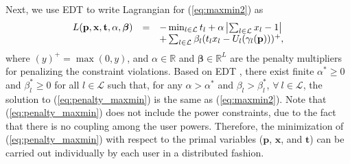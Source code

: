 \documentclass[10pt,journal,letterpaper,compsoc]{IEEEtran}
\begin{document}
{{Next, we use EDT to write Lagrangian for (\ref{eq:maxmin2}) as
\begin{equation}\begin{array}
[c]{lll}L(\mathbf{p},\mathbf{x},\mathbf{t},\alpha,\boldsymbol{\beta})&=&-\min_{l\in\mathcal{L}}t_l+\alpha\left|\sum_{l\in\mathcal{L}} x_l-1\right|\\
&&+\sum_{l\in\mathcal{L}}\beta_l(t_lx_l- U_l(\gamma_l(\mathbf{p})))^{+},
\end{array}
\label{eq:penalty_maxmin}
\end{equation}
where $(y)^{+}=\max(0,y)$, and $\alpha\in\mathbb{R}$ and $\boldsymbol{\beta}\in\mathbb{R}^L$ are the penalty multipliers for penalizing the constraint violations. Based on EDT \cite{chen:2008}, there exist finite $\alpha^*\ge 0$ and $\beta_l^*\ge 0$ for all $l\in\mathcal{L}$ such that, for any $\alpha>\alpha^*$ and $\beta_l>\beta_l^*$, $\forall~l\in\mathcal{L}$, the solution to (\ref{eq:penalty_maxmin}) is the same as (\ref{eq:maxmin2}). Note that (\ref{eq:penalty_maxmin}) does not include the power constraints, due to the fact that there is no coupling among the user powers. Therefore, the minimization of (\ref{eq:penalty_maxmin}) with respect to the primal variables ($\mathbf{p}$, $\mathbf{x}$, and $\mathbf{t}$) can be carried out individually by each user in a distributed fashion.

}}
\end{document}
